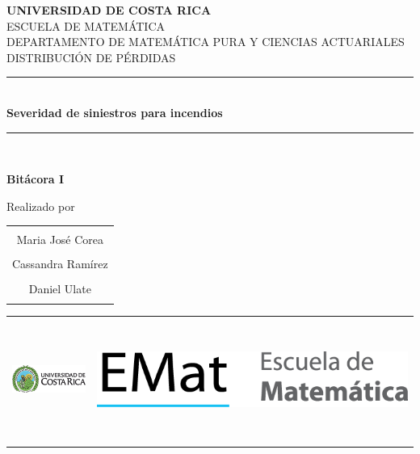 \documentclass[
  oneside]{memoir}
\author{}
\date{\vspace{-2.5em}}
\newcommand{\TituloProy}{Severidad de siniestros para incendios}  %
\newcommand{\EstudianteUno}{Maria Jos\'e Corea}
\newcommand{\EstudianteDos}{Cassandra Ram\'irez}
\newcommand{\EstudianteTres}{Daniel Ulate}
\begin{document}
\frontmatter

\begin{titlingpage}
  \newcommand{\HRule}{\rule{\linewidth}{0.5mm}} %

  \begin{center}

    {\Huge \textbf{UNIVERSIDAD DE COSTA RICA}}\\[0.2cm] 
    {\Large ESCUELA DE MATEM\'ATICA\\[0.2cm]
DEPARTAMENTO DE MATEMÁTICA PURA Y CIENCIAS ACTUARIALES\\[0.2cm] 
DISTRIBUCI\'ON DE P\'ERDIDAS\\[0cm]
} %

   

    \HRule \\[0.6cm]
    \Large \textbf{\TituloProy}
    \HRule \\[0.6cm]

    \vfill
      
    {\Large{\textbf{Bit\'acora I}}}
   
    \vfill
    \begin{center}
      Realizado por %
      \linebreak %
      \linebreak %
      \begin{tabular}{c}
        \hline  \\
        \EstudianteUno  \\ \\
        \EstudianteDos  \\ \\
        \EstudianteTres  \\ \\
        \hline 
      \end{tabular}
    \end{center}

    \vfill
    

    

    \begin{center}
    \begin{tabular}{l @{\hskip 2in} r}
    \includegraphics[height=2cm]{./images/ucr_marca_de_agua}
  & \includegraphics[height=4cm]{./images/EMat_escuela_matematica_horizontal_1} 
    \end{tabular}
    \end{center}


\end{center}
\end{titlingpage}
\end{document}
